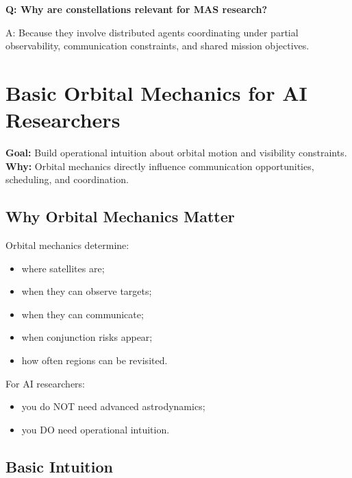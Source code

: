\documentclass[10pt,a4paper,twocolumn]{article}
\newcommand{\lesson}[3]{
\section{#1}
\noindent
\textbf{Goal:} #2 \newline
\textbf{Why:} #3
\vspace{0.1em}
}
\begin{document}
\begin{questionbox}
    \textbf{Q: Why are constellations relevant for MAS research?}

    A: Because they involve distributed agents coordinating under partial observability, communication constraints, and shared mission objectives.
\end{questionbox}



\lesson
{Basic Orbital Mechanics for AI Researchers}
{Build operational intuition about orbital motion and visibility constraints.}
{Orbital mechanics directly influence communication opportunities, scheduling, and coordination.}


\subsection{Why Orbital Mechanics Matter}

Orbital mechanics determine:
\begin{itemize}
    \item where satellites are;
    \item when they can observe targets;
    \item when they can communicate;
    \item when conjunction risks appear;
    \item how often regions can be revisited.
\end{itemize}

For AI researchers:
\begin{itemize}
    \item you do NOT need advanced astrodynamics;
    \item you DO need operational intuition.
\end{itemize}


\subsection{Basic Intuition}
\end{document}
